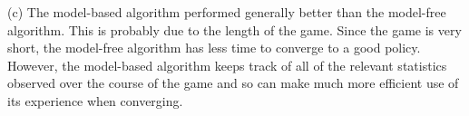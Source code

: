 \documentclass[12pt]{article}
\theoremstyle{remark}
\begin{document}
\noindent (c) The model-based algorithm performed generally better than the model-free algorithm. This is probably due to the length of the game. Since the game is very short, the model-free algorithm has less time to converge to a good policy. However, the model-based algorithm keeps track of all of the relevant statistics observed over the course of the game and so can make much more efficient use of its experience when converging.
\end{document}
